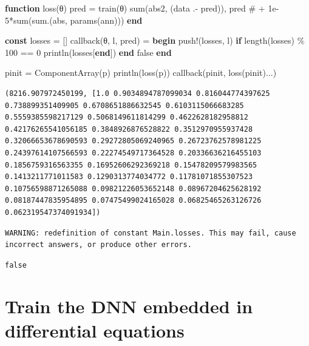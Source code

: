 \documentclass[
  letterpaper,
  DIV=11,
  numbers=noendperiod]{scrreport}
\newenvironment{Shaded}{\begin{snugshade}}{\end{snugshade}}
\newcommand{\CommentTok}[1]{\textcolor[rgb]{0.37,0.37,0.37}{#1}}
\newcommand{\ConstantTok}[1]{\textcolor[rgb]{0.56,0.35,0.01}{#1}}
\newcommand{\ControlFlowTok}[1]{\textcolor[rgb]{0.00,0.23,0.31}{\textbf{#1}}}
\newcommand{\FloatTok}[1]{\textcolor[rgb]{0.68,0.00,0.00}{#1}}
\newcommand{\FunctionTok}[1]{\textcolor[rgb]{0.28,0.35,0.67}{#1}}
\newcommand{\KeywordTok}[1]{\textcolor[rgb]{0.00,0.23,0.31}{\textbf{#1}}}
\newcommand{\NormalTok}[1]{\textcolor[rgb]{0.00,0.23,0.31}{#1}}
\newcommand{\OperatorTok}[1]{\textcolor[rgb]{0.37,0.37,0.37}{#1}}
\begin{document}
\begin{Shaded}
\begin{Highlighting}[]
\KeywordTok{function} \FunctionTok{loss}\NormalTok{(θ)}
\NormalTok{    pred }\OperatorTok{=} \FunctionTok{train}\NormalTok{(θ)}
    \FunctionTok{sum}\NormalTok{(abs2, (data }\OperatorTok{.{-}}\NormalTok{ pred)), pred }\CommentTok{\# + 1e{-}5*sum(sum.(abs, params(ann)))}
\KeywordTok{end}

\KeywordTok{const}\NormalTok{ losses }\OperatorTok{=}\NormalTok{ []}
\FunctionTok{callback}\NormalTok{(θ, l, pred) }\OperatorTok{=} \ControlFlowTok{begin}
    \FunctionTok{push!}\NormalTok{(losses, l)}
    \ControlFlowTok{if} \FunctionTok{length}\NormalTok{(losses) }\OperatorTok{\%} \FloatTok{100} \OperatorTok{==} \FloatTok{0}
        \FunctionTok{println}\NormalTok{(losses[}\KeywordTok{end}\NormalTok{])}
    \ControlFlowTok{end}
    \ConstantTok{false}
\ControlFlowTok{end}

\NormalTok{pinit }\OperatorTok{=} \FunctionTok{ComponentArray}\NormalTok{(p)}
\FunctionTok{println}\NormalTok{(}\FunctionTok{loss}\NormalTok{(p))}
\FunctionTok{callback}\NormalTok{(pinit, }\FunctionTok{loss}\NormalTok{(pinit)}\OperatorTok{...}\NormalTok{)}
\end{Highlighting}
\end{Shaded}

\begin{verbatim}
(8216.907972450199, [1.0 0.9034894787099034 0.816044774397625 0.738899351409905 0.6708651886632545 0.6103115066683285 0.5559385598217129 0.5068149611814299 0.4622628182958812 0.42176265541056185 0.3848926876528822 0.3512970955937428 0.32066653678690593 0.29272805069240965 0.26723762578981225 0.24397614107566593 0.22274549717364528 0.20336636216455103 0.1856759316563355 0.16952606292369218 0.15478209579983565 0.1413211771011583 0.1290313774034772 0.11781071855307523 0.10756598871265088 0.09821226053652148 0.08967204625628192 0.08187447835954895 0.07475499024165028 0.06825465263126726 0.062319547374091934])
\end{verbatim}

\begin{verbatim}
WARNING: redefinition of constant Main.losses. This may fail, cause incorrect answers, or produce other errors.
\end{verbatim}

\begin{verbatim}
false
\end{verbatim}

\section{Train the DNN embedded in differential
equations}\label{train-the-dnn-embedded-in-differential-equations}
\end{document}
